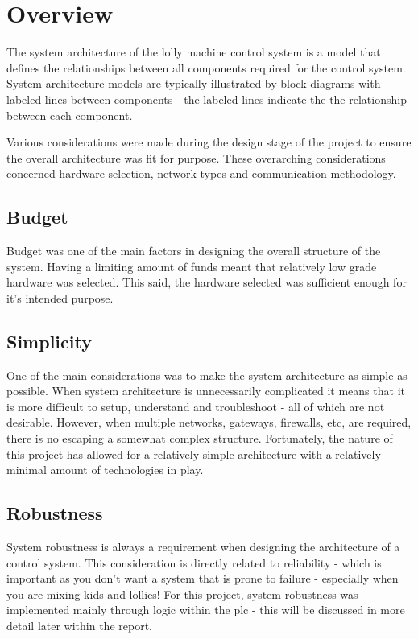 \section{Overview}
    The system architecture of the lolly machine control system is a model that defines the relationships between all  components required for the control system. System architecture models are typically illustrated by block diagrams with labeled lines between components - the labeled lines indicate the the relationship between each component. 

    Various considerations were made during the design stage of the project to ensure the overall architecture was fit for purpose. These overarching considerations concerned hardware selection,  network types and communication methodology.

    \subsection{Budget}
        Budget was one of the main factors in designing the overall structure of the system. Having a limiting amount of funds meant that relatively low grade hardware was selected. This said, the hardware selected was sufficient enough for it’s intended purpose.

    \subsection{Simplicity}
        One of the main considerations was to make the system architecture as simple as possible. When system architecture is unnecessarily complicated it means that it is more difficult to setup, understand and troubleshoot - all of which are not desirable. However, when multiple networks, gateways, firewalls, etc, are required, there is no escaping a somewhat complex structure. Fortunately, the nature of this project has allowed for a relatively simple architecture with a relatively minimal amount of technologies in play.
    
    \subsection{Robustness}
        System robustness is always a requirement when designing the architecture of a control system. This consideration is directly related to reliability - which is important as you don’t want a system that is prone to failure - especially when you are mixing kids and lollies! For this project, system robustness was implemented mainly through logic within the \acrshort{plc} - this will be discussed in more detail later within the report. 
    
